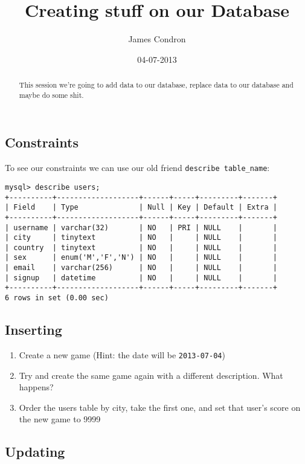 \documentclass[10pt,a4paper]{article}
\begin{document}
\title{Creating stuff on our Database}
\author{James Condron}
\date{04-07-2013}
\maketitle

\begin{abstract}
This session we're going to add data to our database, replace data to our database and maybe do some shit.
\end{abstract}

\subsection{Constraints}

To see our constraints we can use our old friend {\tt describe table\_name}:

\begin{verbatim}
mysql> describe users;
+----------+-------------------+------+-----+---------+-------+
| Field    | Type              | Null | Key | Default | Extra |
+----------+-------------------+------+-----+---------+-------+
| username | varchar(32)       | NO   | PRI | NULL    |       |
| city     | tinytext          | NO   |     | NULL    |       |
| country  | tinytext          | NO   |     | NULL    |       |
| sex      | enum('M','F','N') | NO   |     | NULL    |       |
| email    | varchar(256)      | NO   |     | NULL    |       |
| signup   | datetime          | NO   |     | NULL    |       |
+----------+-------------------+------+-----+---------+-------+
6 rows in set (0.00 sec)
\end{verbatim}

\subsection{Inserting}

\begin{enumerate}
\item Create a new game (Hint: the date will be {\tt 2013-07-04})
\item Try and create the same game again with a different description. What happens?
\item Order the users table by city, take the first one, and set that user's score on the new game to 9999
\end{enumerate}

\subsection{Updating}
\end{document}
